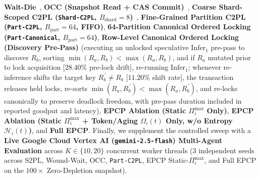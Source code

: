 \documentclass[conference,10pt]{IEEEtran}
\begin{document}
\begin{enumerate}
\textbf{Wait-Die}~\cite{rosenkrantz1978system}, \textbf{OCC (Snapshot Read + CAS Commit)}~\cite{kung1981optimistic}, \textbf{Coarse Shard-Scoped C2PL (\texttt{Shard-C2PL}, $B_{\text{shard}}=8$)}~\cite{bernstein1987concurrency}, \textbf{Fine-Grained Partition C2PL (\texttt{Part-C2PL}, $B_{\text{part}}=64$, FIFO)}, \textbf{64-Partition Canonical Ordered Locking (\texttt{Part-Canonical}, $B_{\text{part}}=64$)}, \textbf{Row-Level Canonical Ordered Locking (Discovery Pre-Pass)} (executing an unlocked speculative $\text{Infer}_1$ pre-pass to discover $R_b$, sorting $\min(R_a, R_b) < \max(R_a, R_b)$, and if $R_a$ mutated prior to lock acquisition [$28.40\%$ pre-lock drift], re-running $\text{Infer}_1$; whenever re-inference shifts the target key $R_b^{\,\prime} \ne R_b$ [$11.20\%$ shift rate], the transaction releases held locks, re-sorts $\min(R_a, R_b^{\,\prime}) < \max(R_a, R_b^{\,\prime})$, and re-locks canonically to preserve deadlock freedom, with pre-pass duration included in reported goodput and latency), \textbf{EPCP Ablation (Static $\Pi_i^{\max}$ Only)}, \textbf{EPCP Ablation (Static $\Pi_i^{\max}$ + Token/Aging $\Omega_i(t)$ Only, w/o Entropy $\mathcal{H}_i(t)$)}, and \textbf{Full EPCP}. Finally, we supplement the controlled sweep with a \textbf{Live Google Cloud Vertex AI (\texttt{gemini-2.5-flash}) Multi-Agent Evaluation} across $K \in \{10, 20\}$ concurrent worker threads ($3$ independent seeds across S2PL, Wound-Wait, OCC, \texttt{Part-C2PL}, EPCP Static-$\Pi_i^{\max}$, and Full EPCP on the $100\times$ Zero-Depletion snapshot).
\end{enumerate}
\end{document}
